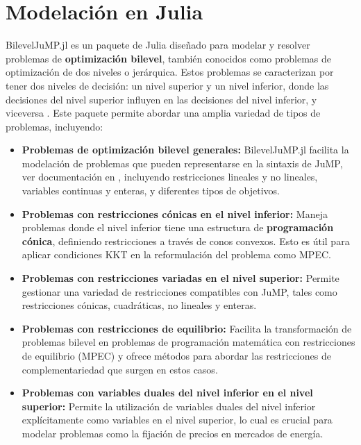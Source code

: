 \section{Modelación en Julia}
BilevelJuMP.jl es un paquete de Julia diseñado para modelar y resolver problemas de \textbf{optimización bilevel}, también conocidos como problemas de optimización de dos niveles o jerárquica. Estos problemas se caracterizan por tener dos niveles de decisión: un nivel superior y un nivel inferior, donde las decisiones del nivel superior influyen en las decisiones del nivel inferior, y viceversa \cite{BilevelJump}.
Este paquete permite abordar una amplia variedad de tipos de problemas, incluyendo:

\begin{itemize}
    \item \textbf{Problemas de optimización bilevel generales:} BilevelJuMP.jl facilita la modelación de problemas que pueden representarse en la sintaxis de JuMP, ver documentación en \cite{JuMPPaper}, incluyendo restricciones lineales y no lineales, variables continuas y enteras, y diferentes tipos de objetivos.
    
    \item \textbf{Problemas con restricciones cónicas en el nivel inferior:} Maneja problemas donde el nivel inferior tiene una estructura de \textbf{programación cónica}, definiendo restricciones a través de conos convexos. Esto es útil para aplicar condiciones KKT en la reformulación del problema como MPEC.
    
    \item \textbf{Problemas con restricciones variadas en el nivel superior:} Permite gestionar una variedad de restricciones compatibles con JuMP, tales como restricciones cónicas, cuadráticas, no lineales y enteras.
    
    \item \textbf{Problemas con restricciones de equilibrio:} Facilita la transformación de problemas bilevel en problemas de programación matemática con restricciones de equilibrio (MPEC) y ofrece métodos para abordar las restricciones de complementariedad que surgen en estos casos.
    
    \item \textbf{Problemas con variables duales del nivel inferior en el nivel superior:} Permite la utilización de variables duales del nivel inferior explícitamente como variables en el nivel superior, lo cual es crucial para modelar problemas como la fijación de precios en mercados de energía.
    

\end{itemize}
